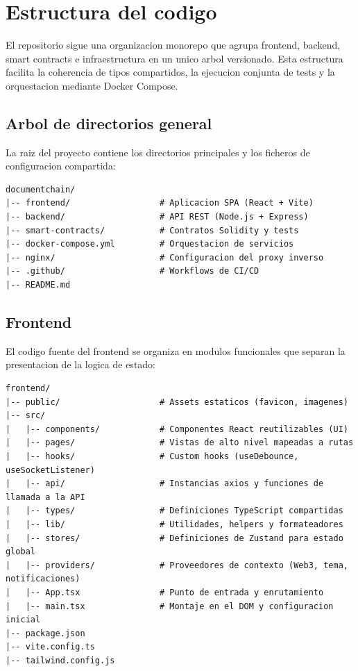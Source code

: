 \documentclass[11pt, a4paper]{article}
\begin{document}
\section{Estructura del codigo}

El repositorio sigue una organizacion monorepo que agrupa frontend, backend, smart contracts e infraestructura en un unico arbol versionado. Esta estructura facilita la coherencia de tipos compartidos, la ejecucion conjunta de tests y la orquestacion mediante Docker Compose.

\subsection{Arbol de directorios general}

La raiz del proyecto contiene los directorios principales y los ficheros de configuracion compartida:

\begin{lstlisting}
documentchain/
|-- frontend/                  # Aplicacion SPA (React + Vite)
|-- backend/                   # API REST (Node.js + Express)
|-- smart-contracts/           # Contratos Solidity y tests
|-- docker-compose.yml         # Orquestacion de servicios
|-- nginx/                     # Configuracion del proxy inverso
|-- .github/                   # Workflows de CI/CD
|-- README.md
\end{lstlisting}

\subsection{Frontend}

El codigo fuente del frontend se organiza en modulos funcionales que separan la presentacion de la logica de estado:

\begin{lstlisting}
frontend/
|-- public/                    # Assets estaticos (favicon, imagenes)
|-- src/
|   |-- components/            # Componentes React reutilizables (UI)
|   |-- pages/                 # Vistas de alto nivel mapeadas a rutas
|   |-- hooks/                 # Custom hooks (useDebounce, useSocketListener)
|   |-- api/                   # Instancias axios y funciones de llamada a la API
|   |-- types/                 # Definiciones TypeScript compartidas
|   |-- lib/                   # Utilidades, helpers y formateadores
|   |-- stores/                # Definiciones de Zustand para estado global
|   |-- providers/             # Proveedores de contexto (Web3, tema, notificaciones)
|   |-- App.tsx                # Punto de entrada y enrutamiento
|   |-- main.tsx               # Montaje en el DOM y configuracion inicial
|-- package.json
|-- vite.config.ts
|-- tailwind.config.js
\end{lstlisting}
\end{document}
